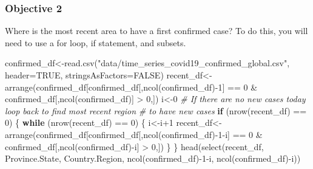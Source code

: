 \documentclass[
]{article}
\newenvironment{Shaded}{\begin{snugshade}}{\end{snugshade}}
\newcommand{\AttributeTok}[1]{\textcolor[rgb]{0.77,0.63,0.00}{#1}}
\newcommand{\CommentTok}[1]{\textcolor[rgb]{0.56,0.35,0.01}{\textit{#1}}}
\newcommand{\ConstantTok}[1]{\textcolor[rgb]{0.00,0.00,0.00}{#1}}
\newcommand{\ControlFlowTok}[1]{\textcolor[rgb]{0.13,0.29,0.53}{\textbf{#1}}}
\newcommand{\DecValTok}[1]{\textcolor[rgb]{0.00,0.00,0.81}{#1}}
\newcommand{\FunctionTok}[1]{\textcolor[rgb]{0.00,0.00,0.00}{#1}}
\newcommand{\NormalTok}[1]{#1}
\newcommand{\OtherTok}[1]{\textcolor[rgb]{0.56,0.35,0.01}{#1}}
\newcommand{\SpecialCharTok}[1]{\textcolor[rgb]{0.00,0.00,0.00}{#1}}
\newcommand{\StringTok}[1]{\textcolor[rgb]{0.31,0.60,0.02}{#1}}
\begin{document}
\hypertarget{objective-2}{%
\subsubsection{Objective 2}\label{objective-2}}

Where is the most recent area to have a first confirmed case? To do
this, you will need to use a for loop, if statement, and subsets.

\begin{Shaded}
\begin{Highlighting}[]
\NormalTok{confirmed\_df}\OtherTok{\textless{}{-}}\FunctionTok{read.csv}\NormalTok{(}\StringTok{"data/time\_series\_covid19\_confirmed\_global.csv"}\NormalTok{, }
                       \AttributeTok{header=}\ConstantTok{TRUE}\NormalTok{, }\AttributeTok{stringsAsFactors=}\ConstantTok{FALSE}\NormalTok{)}
\NormalTok{recent\_df}\OtherTok{\textless{}{-}}\FunctionTok{arrange}\NormalTok{(confirmed\_df[confirmed\_df[,}\FunctionTok{ncol}\NormalTok{(confirmed\_df)}\SpecialCharTok{{-}}\DecValTok{1}\NormalTok{] }\SpecialCharTok{==} \DecValTok{0} 
                                \SpecialCharTok{\&}\NormalTok{ confirmed\_df[,}\FunctionTok{ncol}\NormalTok{(confirmed\_df)] }\SpecialCharTok{\textgreater{}} \DecValTok{0}\NormalTok{,])}
\NormalTok{i}\OtherTok{\textless{}{-}}\DecValTok{0}
\CommentTok{\# If there are no new cases today loop back to find most recent region}
\CommentTok{\# to have new cases}
\ControlFlowTok{if}\NormalTok{ (}\FunctionTok{nrow}\NormalTok{(recent\_df) }\SpecialCharTok{==} \DecValTok{0}\NormalTok{) \{}
  \ControlFlowTok{while}\NormalTok{ (}\FunctionTok{nrow}\NormalTok{(recent\_df) }\SpecialCharTok{==} \DecValTok{0}\NormalTok{) \{}
\NormalTok{    i}\OtherTok{\textless{}{-}}\NormalTok{i}\SpecialCharTok{+}\DecValTok{1}
\NormalTok{    recent\_df}\OtherTok{\textless{}{-}}\FunctionTok{arrange}\NormalTok{(confirmed\_df[confirmed\_df[,}\FunctionTok{ncol}\NormalTok{(confirmed\_df)}\SpecialCharTok{{-}}\DecValTok{1}\SpecialCharTok{{-}}\NormalTok{i] }\SpecialCharTok{==} \DecValTok{0} 
                                \SpecialCharTok{\&}\NormalTok{ confirmed\_df[,}\FunctionTok{ncol}\NormalTok{(confirmed\_df)}\SpecialCharTok{{-}}\NormalTok{i] }\SpecialCharTok{\textgreater{}} \DecValTok{0}\NormalTok{,])}
\NormalTok{  \}}
\NormalTok{\}}
\FunctionTok{head}\NormalTok{(}\FunctionTok{select}\NormalTok{(recent\_df, Province.State, Country.Region, }\FunctionTok{ncol}\NormalTok{(confirmed\_df)}\SpecialCharTok{{-}}\DecValTok{1}\SpecialCharTok{{-}}\NormalTok{i, }
            \FunctionTok{ncol}\NormalTok{(confirmed\_df)}\SpecialCharTok{{-}}\NormalTok{i))}
\end{Highlighting}
\end{Shaded}
\end{document}
